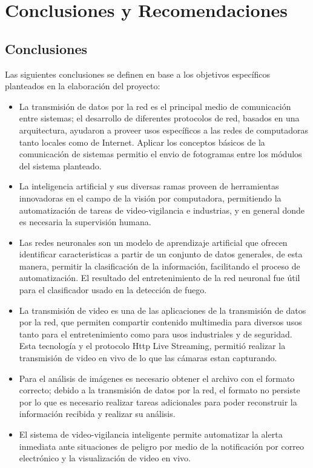 \chapter{Conclusiones y Recomendaciones}
\section{Conclusiones}
Las siguientes conclusiones se definen en base a los objetivos específicos planteados en la elaboración del proyecto:\\

\begin{itemize}
    \item La transmisión de datos por la red es el principal medio de comunicación entre sistemas; el desarrollo de diferentes protocolos de red, basados en una arquitectura, ayudaron a proveer usos específicos a las redes de computadoras tanto locales como de Internet. Aplicar los conceptos básicos de la comunicación de sistemas permitio el envio de fotogramas entre los módulos del sistema planteado.
    
    \item La inteligencia artificial y sus diversas ramas proveen de herramientas innovadoras en el campo de la visión por computadora, permitiendo la automatización de tareas de video-vigilancia e industrias, y en general donde es necesaria la supervisión humana.
    
    \item Las redes neuronales son un modelo de aprendizaje artificial que ofrecen identificar caracteristicas a partir de un conjunto de datos generales, de esta manera, permitir la clasificación de la información, facilitando el proceso de automatización. El resultado del entretenimiento de la red neuronal fue útil para el clasificador usado en la detección de fuego.
    
    \item La transmisión de video es una de las aplicaciones de la transmisión de datos por la red, que permiten compartir contenido multimedia para diversos usos tanto para el entretenimiento como para usos industriales y de seguridad. Esta tecnología y el protocolo Http Live Streaming, permitió realizar la transmisión de video en vivo de lo que las cámaras estan capturando.
    
    \item Para el análisis de imágenes es necesario obtener el archivo con el formato correcto; debido a la transmisión de datos por la red, el formato no persiste por lo que es necesario realizar tareas adicionales para poder reconstruir la información recibida y realizar su análisis.
    
    \item El sistema de video-vigilancia inteligente permite automatizar la alerta inmediata ante situaciones de peligro por medio de la notificación por correo electrónico y la visualización de video en vivo.
\end{itemize}

